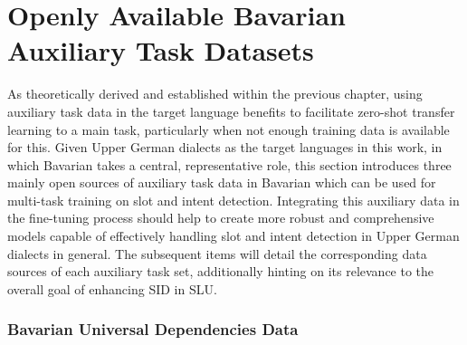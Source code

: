 \documentclass[11pt,a4paper,twoside,openright]{scrbook}
\begin{document}
\section{Openly Available Bavarian Auxiliary Task Datasets}

As theoretically derived and established within the previous chapter, using auxiliary task data in the target language benefits to facilitate zero-shot transfer learning to a main task, particularly when not enough training data is available for this. Given Upper German dialects as the target languages in this work, in which Bavarian takes a central, representative role, this section introduces three mainly open sources of auxiliary task data in Bavarian which can be used for multi-task training on slot and intent detection. Integrating this auxiliary data in the fine-tuning process should help to create more robust and comprehensive models capable of effectively handling slot and intent detection in Upper German dialects in general. The subsequent items will detail the corresponding data sources of each auxiliary task set, additionally hinting on its relevance to the overall goal of enhancing SID in SLU.


\subsubsection{Bavarian Universal Dependencies Data}
\end{document}
